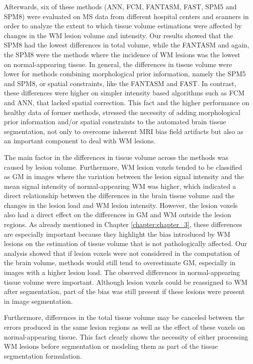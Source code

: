 Afterwards, six of these methods (ANN, FCM, FANTASM, FAST, SPM5 and SPM8) were evaluated on MS data from different hospital centers and scanners in order to analyze the extent to which tissue volume estimations were affected by changes in the WM lesion volume and intensity. Our results showed that the SPM8 had the lowest differences in total volume, while the FANTASM and again, the SPM8 were the methods where the incidence of WM lesions was the lowest on normal-appearing tissue. In general, the differences in tissue volume were lower for methods combining morphological prior information, namely the SPM5 and SPM8, or spatial constraints, like the FANTASM and FAST. In contrast, these differences were higher on simpler intensity based algorithms such as FCM and ANN, that lacked spatial correction. This fact and the higher performance on healthy data of former methods, stressed the necessity of adding morphological prior information and/or spatial constraints to the automated brain tissue segmentation, not only to overcome inherent MRI bias field artifacts but also as an important component to deal with WM lesions.

The main factor in the differences in tissue volume across the methods was caused by lesion volume. Furthermore, WM lesion voxels tended to be classified as GM in images where the variation between the lesion signal intensity and the mean signal intensity of normal-appearing WM was higher, which indicated a direct relationship between the differences in the brain tissue volume and the changes in the lesion load and WM lesion intensity. However, the lesion voxels also had a direct effect on the differences in GM and WM outside the lesion regions. As already mentioned in Chapter \ref{chapter:chapter_3}, these differences are especially important because they highlight the bias introduced by WM lesions on the estimation of tissue volume that is not pathologically affected. Our analysis showed that if lesion voxels were not considered in the computation of the brain volume, methods would still tend to overestimate GM, especially in images with a higher lesion load. 
The observed differences in normal-appearing tissue volume were important. Although lesion voxels could be reassigned to WM after segmentation, part of the bias was still present if these lesions were present in image segmentation.

Furthermore, differences in the total tissue volume may be canceled between the errors produced in the same lesion regions as well as the effect of these voxels on normal-appearing tissue. This fact clearly shows the necessity of either processing WM lesions before segmentation or modeling them as part of the tissue segmentation formulation. 


